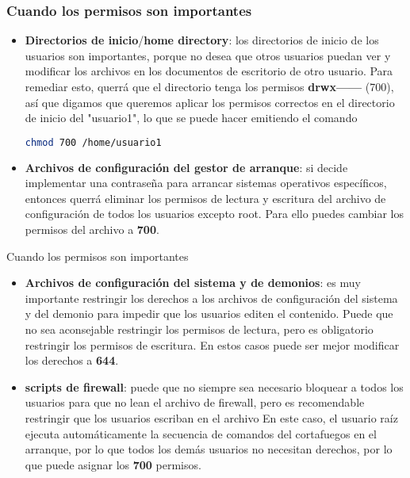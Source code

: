 \begin{frame}[fragile]
  \frametitle{Cuando los permisos son importantes}
  \begin{itemize}
    \item \textbf{Directorios de inicio}/\textbf{home directory}: los
      directorios de inicio de los usuarios son importantes, porque no desea
      que otros usuarios puedan ver y modificar los archivos en los documentos
      de escritorio de otro usuario. Para remediar esto, querrá que el
      directorio tenga los permisos \textbf{drwx------} (700), así que
      digamos que queremos aplicar los permisos correctos en el directorio de
      inicio del "usuario1", lo que se puede hacer emitiendo el comando
      \begin{lstlisting}[language=Bash]
chmod 700 /home/usuario1
      \end{lstlisting}

    \item \textbf{Archivos de configuración del gestor de arranque}: si decide
      implementar una contraseña para arrancar sistemas operativos específicos,
      entonces querrá eliminar los permisos de lectura y escritura del archivo
      de configuración de todos los usuarios excepto root. Para ello puedes
      cambiar los permisos del archivo a \textbf{700}.
  \end{itemize}
\end{frame}

\begin{frame}[c]{Cuando los permisos son importantes}
  \begin{itemize}
    \item \textbf{Archivos de configuración del sistema y de demonios}: es muy
      importante restringir los derechos a los archivos de configuración del
      sistema y del demonio para impedir que los usuarios editen el contenido.
      Puede que no sea aconsejable restringir los permisos de lectura, pero es
      obligatorio restringir los permisos de escritura. En estos casos puede
      ser mejor modificar los derechos a \textbf{644}.

    \item \textbf{scripts de firewall}: puede que no siempre sea necesario
      bloquear a todos los usuarios para que no lean el archivo de firewall,
      pero es recomendable restringir que los usuarios escriban en el archivo
      En este caso, el usuario raíz ejecuta automáticamente la secuencia de
      comandos del cortafuegos en el arranque, por lo que todos los demás
      usuarios no necesitan derechos, por lo que puede asignar los
      \textbf{700} permisos.
  \end{itemize}
\end{frame}
